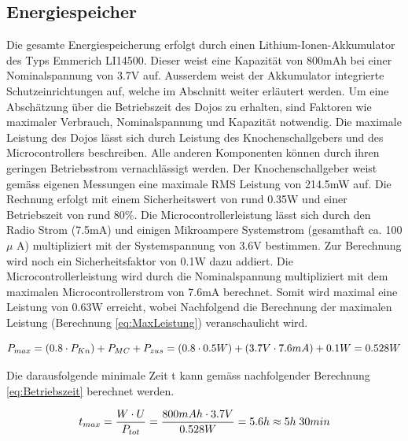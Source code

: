 \subsection{Energiespeicher}\label{sec:energiespeicher}

Die gesamte Energiespeicherung erfolgt durch einen Lithium-Ionen-Akkumulator des Typs Emmerich LI14500. Dieser weist eine Kapazität von 800mAh bei einer Nominalspannung von 3.7V auf. Ausserdem weist der Akkumulator integrierte Schutzeinrichtungen auf, welche im Abschnitt  weiter erläutert werden. Um eine Abschätzung über die Betriebszeit des Dojos zu erhalten, sind Faktoren wie maximaler Verbrauch, Nominalspannung und Kapazität notwendig. Die maximale Leistung des Dojos lässt sich durch Leistung des Knochenschallgebers und des Microcontrollers beschreiben. Alle anderen Komponenten können durch ihren geringen Betriebsstrom vernachlässigt werden. Der Knochenschallgeber weist gemäss eigenen Messungen eine maximale RMS Leistung von 214.5mW auf. Die Rechnung erfolgt mit einem Sicherheitswert von rund 0.35W und einer Betriebszeit von rund 80$\%$. Die Microcontrollerleistung lässt sich durch den Radio Strom (7.5mA) und einigen Mikroampere Systemstrom (gesamthaft ca. 100 $\mu$ A) multipliziert mit der Systemspannung von 3.6V bestimmen. Zur Berechnung wird noch ein Sicherheitsfaktor von 0.1W dazu addiert. Die Microcontrollerleistung wird durch die Nominalspannung multipliziert mit dem maximalen Microcontrollerstrom von 7.6mA berechnet. Somit wird maximal eine Leistung von 0.63W erreicht, wobei Nachfolgend die Berechnung der maximalen Leistung (Berechnung \ref{eq:MaxLeistung}) veranschaulicht wird.

\begin{equation}
\centering
P_{max}=\left(0.8\cdot P_{Kn}\right)+P_{MC}+P_{zus}=(0.8\cdot 0.5W)+(3.7V \cdot 7.6mA)+0.1W=0.528W
\label{eq:MaxLeistung}
\end{equation}

Die darausfolgende minimale Zeit t kann gemäss nachfolgender Berechnung \ref{eq:Betriebszeit} berechnet werden.

\begin{equation}
\centering
t_{max}=\frac{W\cdot U}{P_{tot}}=\frac{800mAh \cdot 3.7V}{0.528W}=5.6h\approx 5h \thickspace 30min
\label{eq:Betriebszeit}
\end{equation}



